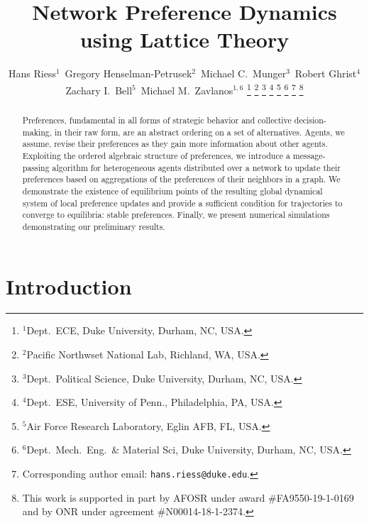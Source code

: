 \documentclass[conference]{ieeeconf}
\begin{document}
\title{\bf Network Preference Dynamics using Lattice Theory}

\author{Hans Riess$^{1}$~Gregory Henselman-Petrusek$^{2}$~Michael C.~Munger$^{3}$~Robert Ghrist$^{4}$ \\ Zachary I.~Bell$^{5}$~Michael M.~Zavlanos$^{1,6}$%
\thanks{$^{1}$Dept.~ECE, Duke University, Durham, NC, USA.}%
\thanks{$^{2}$Pacific Northwset National Lab, Richland, WA, USA.}%
\thanks{$^{3}$Dept.~Political Science, Duke University, Durham, NC, USA.}%
\thanks{$^{4}$Dept.~ESE, University of Penn., Philadelphia, PA, USA.}%
\thanks{$^{5}$Air Force Research Laboratory, Eglin AFB, FL, USA.}%
\thanks{$^{6}$Dept.~Mech.~Eng.~\& Material Sci, Duke University, Durham, NC, USA.}%
\thanks{Corresponding author email: {\tt hans.riess@duke.edu}.}%
\thanks{This work is supported in part by AFOSR under award \#FA9550-19-1-0169 and by ONR under agreement \#N00014-18-1-2374.}%
}

\maketitle

\begin{abstract}
Preferences, fundamental in all forms of strategic behavior and collective decision-making, in their raw form, are an abstract ordering on a set of alternatives. Agents, we assume, revise their preferences as they gain more information about other agents. Exploiting the ordered algebraic structure of preferences,  we introduce a message-passing algorithm for heterogeneous agents distributed over a network to update their preferences based on aggregations of the preferences of their neighbors in a graph. We demonstrate the existence of equilibrium points of the resulting global dynamical system of local preference updates and provide a sufficient condition for trajectories to converge to equilibria: stable preferences. Finally, we present numerical simulations demonstrating our preliminary results. %
\end{abstract}


\section{Introduction}
\end{document}
